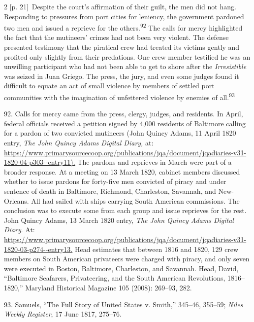 \documentclass[10pt,a4paper]{article}
\begin{document}
\begin{paracol}{2}
{\scriptsize\color{gray} [p. 21]}\ Despite the court’s affirmation of their guilt, the men did not hang. Responding to pressures from port cities for leniency, the government pardoned two men and issued a reprieve for the others.\nobreak\textsuperscript{92} The calls for mercy highlighted the fact that the mutineers’ crimes had not been very violent. The defense presented testimony that the piratical crew had treated its victims gently and profited only slightly from their predations. One crew member testified he was an unwilling participant who had not been able to get to shore after the \textit{Irresistible} was seized in Juan Griego. The press, the jury, and even some judges found it difficult to equate an act of small violence by members of settled port communities with the imagination of unfettered violence by enemies of all.\nobreak\textsuperscript{93}\par{\small 92. Calls for mercy came from the press, clergy, judges, and residents. In April, federal officials received a petition signed by 4,000 residents of Baltimore calling for a pardon of two convicted mutineers (John Quincy Adams, 11 April 1820 entry, \textit{The John Quincy Adams Digital Diary,} at: \url{https://www.primarysourcecoop.org/publications/jqa/document/jqadiaries-v31-1820-04-p303--entry11).} The pardons and reprieves in March were part of a broader response. At a meeting on 13 March 1820, cabinet members discussed whether to issue pardons for forty-five men convicted of piracy and under sentence of death in Baltimore, Richmond, Charleston, Savannah, and New-Orleans. All had sailed with ships carrying South American commissions. The conclusion was to execute some from each group and issue reprieves for the rest. John Quincy Adams, 13 March 1820 entry, \textit{The John Quincy Adams Digital Diary}. At: \url{https://www.primarysourcecoop.org/publications/jqa/document/jqadiaries-v31-1820-03-p274--entry13.} Head estimates that between 1816 and 1820, 129 crew members on South American privateers were charged with piracy, and only seven were executed in Boston, Baltimore, Charleston, and Savannah. Head, David, “Baltimore Seafarers, Privateering, and the South American Revolutions, 1816–1820,” Maryland Historical Magazine 105 (2008): 269–93, 282.\par}{\small 93. Samuels, “The Full Story of United States v. Smith,” 345–46, 355–59; \textit{Niles Weekly Register}, 17 June 1817, 275–76.\par}
\switchcolumn*

\end{paracol}
\end{document}
